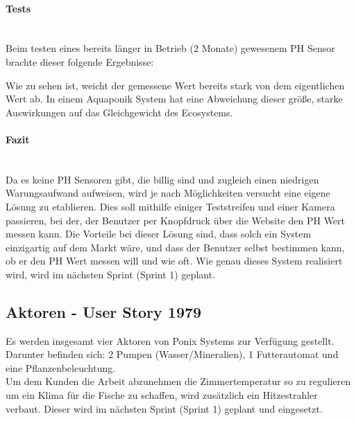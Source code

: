 \newpage
\paragraph{Tests} \mbox{} \\
Beim testen eines bereits l\"anger in Betrieb (2 Monate) gewesenem PH Sensor brachte dieser folgende Ergebnisse: \\
\begin{minipage}{5in}
  \centering
\end{minipage}
Wie zu sehen ist, weicht der gemessene Wert bereits stark von dem eigentlichen Wert ab. In einem Aquaponik System hat eine Abweichung dieser gr\"o{\ss}e, starke Auswirkungen auf das Gleichgewicht des Ecosystems. \\
\paragraph{Fazit} \mbox{} \\
Da es keine PH Sensoren gibt, die billig sind und zugleich einen niedrigen Warungsaufwand aufweisen, wird je nach M\"oglichkeiten versucht eine eigene L\"osung zu etablieren. Dies soll mithilfe einiger Teststreifen und einer Kamera passieren, bei der, der Benutzer per Knopfdruck \"uber die Website den PH Wert messen kann. Die Vorteile bei dieser L\"osung sind, dass solch ein System einzigartig auf dem Markt w\"are, und dass der Benutzer selbst bestimmen kann, ob er den PH Wert messen will und wie oft. Wie genau dieses System realisiert wird, wird im n\"achsten Sprint (Sprint 1) geplant.
\newpage

\subsection{Aktoren - User Story 1979}
Es werden insgesamt vier Aktoren von Ponix Systems zur Verf\"ugung gestellt. Darunter befinden sich: 2 Pumpen (Wasser/Mineralien), 1 Futterautomat und eine Pflanzenbeleuchtung. \\
Um dem Kunden die Arbeit abzunehmen die Zimmertemperatur so zu regulieren um ein Klima f\"ur die Fische zu schaffen, wird zus\"atzlich ein Hitzestrahler verbaut. Dieser wird im n\"achsten Sprint (Sprint 1) geplant und eingesetzt.

